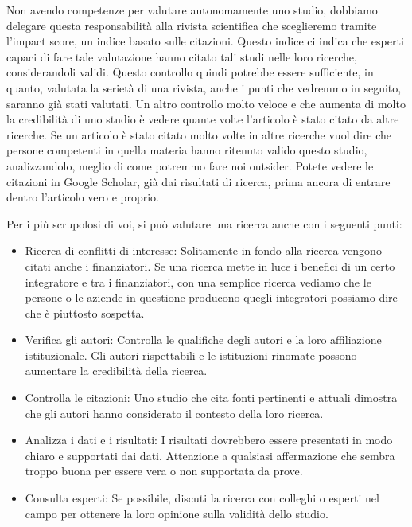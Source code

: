 \documentclass[12pt]{book} %
\begin{document}
\bigskip

Non avendo competenze per valutare autonomamente uno studio, dobbiamo delegare questa responsabilità alla rivista
scientifica che sceglieremo tramite l'impact score, un indice basato sulle citazioni. Questo indice ci indica che
esperti capaci di fare tale valutazione hanno citato tali studi nelle loro ricerche, considerandoli validi. Questo
controllo quindi potrebbe essere sufficiente, in quanto, valutata la serietà di una rivista, anche i punti che vedremmo
in seguito, saranno già stati valutati. Un altro controllo molto veloce e che aumenta di molto la credibilità di uno
studio è vedere quante volte l'articolo è stato citato da altre ricerche. Se un articolo è stato
citato molto volte in altre ricerche vuol dire che persone competenti in quella materia hanno ritenuto valido questo
studio, analizzandolo, meglio di come potremmo fare noi outsider. Potete vedere le citazioni in Google Scholar, già dai
risultati di ricerca, prima ancora di entrare dentro l'articolo vero e proprio.


\bigskip

Per i più scrupolosi di voi, si può valutare una ricerca anche con i seguenti punti:


\bigskip

\begin{itemize}
\item Ricerca di conflitti di interesse: Solitamente in fondo alla ricerca vengono citati anche i finanziatori. Se una
ricerca mette in luce i benefici di un certo integratore e tra i finanziatori, con una semplice ricerca vediamo che le
persone o le aziende in questione producono quegli integratori possiamo dire che è piuttosto sospetta.
\item Verifica gli autori: Controlla le qualifiche degli autori e la loro affiliazione istituzionale. Gli autori
rispettabili e le istituzioni rinomate possono aumentare la credibilità della ricerca.
\item Controlla le citazioni: Uno studio che cita fonti pertinenti e attuali dimostra che gli autori hanno considerato
il contesto della loro ricerca.
\item Analizza i dati e i risultati: I risultati dovrebbero essere presentati in modo chiaro e supportati dai dati.
Attenzione a qualsiasi affermazione che sembra troppo buona per essere vera o non supportata da prove.
\item Consulta esperti: Se possibile, discuti la ricerca con colleghi o esperti nel campo per ottenere la loro opinione
sulla validità dello studio.
\end{itemize}
\end{document}
